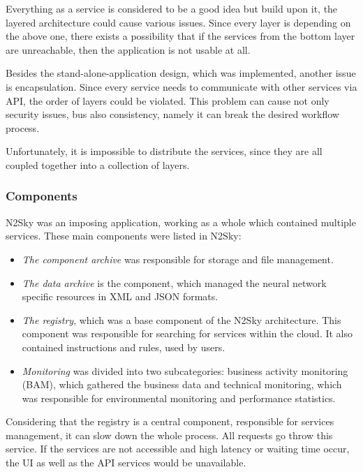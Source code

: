 Everything as a service is considered to be a good idea but build upon it, the layered architecture could cause various issues. Since every layer is depending on the above one, there exists a possibility that if the services from the bottom layer are unreachable, then the application is not usable at all. 

Besides the stand-alone-application design, which was implemented, another issue is encapsulation. Since every service needs to communicate with other services via API, the order of layers could be violated. This problem can cause not only security issues, bus also consistency, namely it can break the desired workflow process.

Unfortunately, it is impossible to distribute the services, since they are all coupled together into a collection of layers.  

\subsubsection{Components}\label{Components}

N2Sky was an imposing application, working as a whole which contained multiple services. These main components were listed in N2Sky:

\begin{itemize}
\item \emph{The component archive} was responsible for storage and file management.
\item \emph{The data archive} is the component, which managed the neural network specific resources in XML and JSON formats. 
\item \emph{The registry}, which was a base component of the N2Sky architecture. This component was responsible for searching for services within the cloud.  It also contained instructions and rules, used by users. 
\item \emph{Monitoring} was divided into two subcategories: business activity monitoring (BAM), which gathered the business data and technical monitoring, which was responsible for environmental monitoring and performance statistics. 
\end{itemize}

Considering that the registry is a central component, responsible for services management, it can slow down the whole process. All requests go throw this service. If the services are not accessible and high latency or waiting time occur, the UI as well as the API services would be unavailable.

